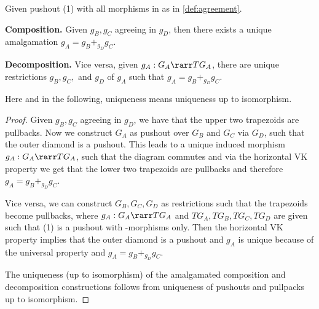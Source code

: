 \begin{fact}\label{fact:amalgamation}
Given pushout (1) with all morphisms in \M as in \autoref{def:agreement}.
\begin{description} 
	\item \textbf{Composition.}
		Given $g_B,g_C$ agreeing in $g_D$, then there exists a unique amalgamation $g_A = g_B +_{g_D} g_C$. 
	\item \textbf{Decomposition.}
		Vice versa, given $g_A: G_A \rarr TG_A$, there are unique restrictions $g_B, g_C,$ and $g_D$ of $g_A$ such that $g_A = g_B +_{g_D} g_C$.
\end{description}
Here and in the following, uniqueness means uniqueness up to isomorphism.
\end{fact}

\begin{proof}
Given $g_B, g_C$ agreeing in $g_D$, we have that the upper two trapezoids are pullbacks. Now we construct $G_A$ as pushout over $G_B$ and $G_C$ via $G_D$, such that the outer diamond is a pushout. This leads to a unique induced morphism $g_A: G_A \rarr TG_A$, such that the diagram commutes and via the horizontal VK property we get that the lower two trapezoids are pullbacks and therefore $g_A = g_B +_{g_D} g_C$.

Vice versa, we can construct $G_B, G_C, G_D$ as restrictions such that the trapezoids become pullbacks, where $g_A: G_A \rarr TG_A$ and $TG_A, TG_B, TG_C, TG_D$ are given such that (1) is a pushout with \M-morphisms only. Then the horizontal VK property implies that the outer diamond is a pushout and $g_A$ is unique because of the universal property and $g_A = g_B +_{g_D} g_C$.

The uniqueness (up to isomorphism) of the amalgamated composition and decomposition constructions follows from uniqueness of pushouts
and pullpacks up to isomorphism.
\end{proof}

